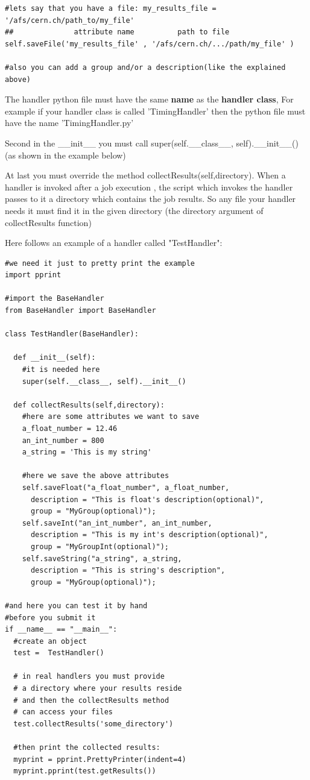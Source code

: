 \documentclass{lhcbnote}
\begin{document}
\begin{verbatim}
#lets say that you have a file: my_results_file = '/afs/cern.ch/path_to/my_file'
##				attribute name 			path to file
self.saveFile('my_results_file' , '/afs/cern.ch/.../path/my_file' )
					
#also you can add a group and/or a description(like the explained above)
\end{verbatim}

The handler python file must have the same {\bf name} as the {\bf handler class},
For example if your handler class is called 'TimingHandler' then the python file must have the name 'TimingHandler.py'
		
Second in the \_\_init\_\_ you must call super(self.\_\_class\_\_, self).\_\_init\_\_() (as shown in the example below)
		
At last you must override the method collectResults(self,directory).
When a handler is invoked after a job execution , the script which invokes the handler passes to it 
a directory which contains the job results. So any file your handler needs it must find it in the given directory (the directory argument of collectResults function)
		
\vspace{2 mm}

Here follows an example of a handler called "TestHandler":

\begin{verbatim}
#we need it just to pretty print the example
import pprint

#import the BaseHandler
from BaseHandler import BaseHandler

class TestHandler(BaseHandler):

  def __init__(self):
    #it is needed here
    super(self.__class__, self).__init__()

  def collectResults(self,directory):
    #here are some attributes we want to save
    a_float_number = 12.46
    an_int_number = 800
    a_string = 'This is my string'

    #here we save the above attributes
    self.saveFloat("a_float_number", a_float_number,
      description = "This is float's description(optional)",
      group = "MyGroup(optional)");
    self.saveInt("an_int_number", an_int_number,
      description = "This is my int's description(optional)",
      group = "MyGroupInt(optional)");
    self.saveString("a_string", a_string,
      description = "This is string's description",
      group = "MyGroup(optional)");

#and here you can test it by hand
#before you submit it
if __name__ == "__main__":
  #create an object
  test =  TestHandler()
    
  # in real handlers you must provide
  # a directory where your results reside
  # and then the collectResults method 
  # can access your files
  test.collectResults('some_directory')
    
  #then print the collected results:
  myprint = pprint.PrettyPrinter(indent=4)
  myprint.pprint(test.getResults())
\end{verbatim}
\end{document}
